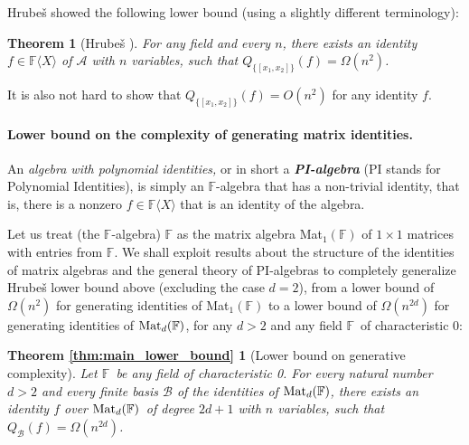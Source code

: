 \documentclass[12pt,reqno]{article}
\newcounter{tmpt}
\newtheorem{theorem}{Theorem}
\newtheorem*{main-lower-bound}{Theorem \ref{thm:main_lower_bound}}
\newcommand\F{\ensuremath{\mathbb F}}
\newcommand {\para}[1] {\paragraph{#1}}
\newcommand{\matd}{{\ensuremath{{\rm Mat}_d(\F)}}}
\newcommand{\mattwo}{{\ensuremath{{\rm Mat}_2(\F)}}}
\newcommand{\freea}{\ensuremath{\F\langle X\rangle}}
\newenvironment{comment}{\QuadSpace\par\noindent{\bf Comment}:}{\HalfSpace}
\newcommand{\QuadSpace}{\vspace{0.25\baselineskip}}
\newcommand{\HalfSpace}{\vspace{0.5\baselineskip}}
\begin{document}
 Hrube\v s \cite{Hru11} showed the following lower bound (using a slightly different terminology):

\setcounter{tmpt}{\thetheorem}
\begin{theorem}[Hrube\v s \cite{Hru11}]\label{thm:Hrubes} For any field and every $n$, there exists an identity $f\in\freea$ of $\mathscr A$  with $n$ variables, such that $Q_{\{[x_1,x_2]\}}(f) = \Omega(n^2)$.
\end{theorem}

It is also not hard to show that $Q_{\{[x_1,x_2]\}}(f) = O(n^2)$ for any identity $f$.

\para{Lower bound on the complexity of generating matrix identities.}

%

An \textit{algebra with polynomial identities, }or in short a \textbf{\textit{PI-algebra}} (PI stands for  Polynomial Identities), is  simply an \F-algebra that has a non-trivial identity, that is, there is a nonzero $f\in\freea$ that is an identity of the algebra.

Let us treat (the \F-algebra) $\F$ as the matrix algebra Mat$_1(\F)$ of $1\times 1$ matrices with entries from \F.
We shall exploit results about the structure of the identities of matrix algebras and the general theory of PI-algebras to completely generalize Hrube\v s \cite{Hru11} lower bound above (excluding the case $d=2$), from a lower bound of \(\Omega(n^2)\) for generating identities of Mat$_1(\F)$ to a lower bound of $\Omega(n^{2d})$ for generating identities of \matd, for any $d>2$ and any field \F \ of characteristic 0:

\begin{main-lower-bound}[Lower bound on generative complexity]
Let \F\ be any field of characteristic 0.
For every natural number $d>2$ and  every finite basis \(\mathcal B\) of the  identities of  \matd, there exists an identity \(f\) over \matd\ of degree $2d+1$ with $n$ variables, such that $Q_{\mathcal B}(f)=\Omega(n^{2d})$.
\end{main-lower-bound}
%
\end{document}
